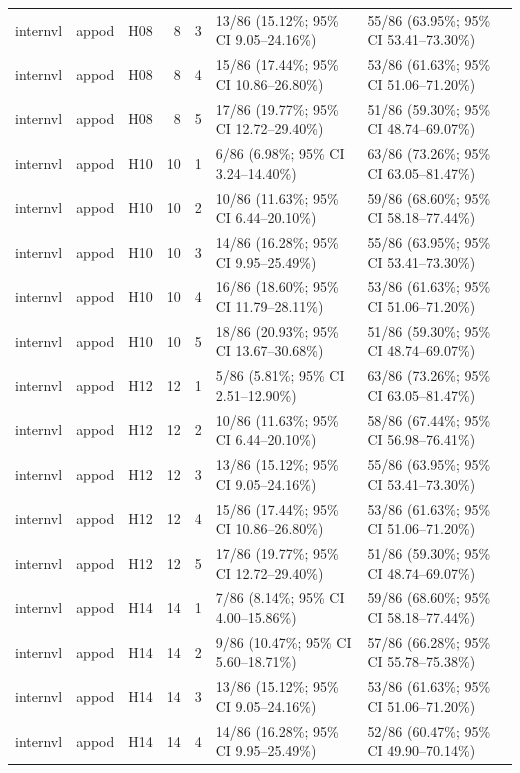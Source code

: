 \begin{longtable}{lllrrll}
internvl & appod & H08 & 8 & 3 & 13/86 (15.12\%; 95\% CI 9.05–24.16\%) & 55/86 (63.95\%; 95\% CI 53.41–73.30\%) \\
internvl & appod & H08 & 8 & 4 & 15/86 (17.44\%; 95\% CI 10.86–26.80\%) & 53/86 (61.63\%; 95\% CI 51.06–71.20\%) \\
internvl & appod & H08 & 8 & 5 & 17/86 (19.77\%; 95\% CI 12.72–29.40\%) & 51/86 (59.30\%; 95\% CI 48.74–69.07\%) \\
internvl & appod & H10 & 10 & 1 & 6/86 (6.98\%; 95\% CI 3.24–14.40\%) & 63/86 (73.26\%; 95\% CI 63.05–81.47\%) \\
internvl & appod & H10 & 10 & 2 & 10/86 (11.63\%; 95\% CI 6.44–20.10\%) & 59/86 (68.60\%; 95\% CI 58.18–77.44\%) \\
internvl & appod & H10 & 10 & 3 & 14/86 (16.28\%; 95\% CI 9.95–25.49\%) & 55/86 (63.95\%; 95\% CI 53.41–73.30\%) \\
internvl & appod & H10 & 10 & 4 & 16/86 (18.60\%; 95\% CI 11.79–28.11\%) & 53/86 (61.63\%; 95\% CI 51.06–71.20\%) \\
internvl & appod & H10 & 10 & 5 & 18/86 (20.93\%; 95\% CI 13.67–30.68\%) & 51/86 (59.30\%; 95\% CI 48.74–69.07\%) \\
internvl & appod & H12 & 12 & 1 & 5/86 (5.81\%; 95\% CI 2.51–12.90\%) & 63/86 (73.26\%; 95\% CI 63.05–81.47\%) \\
internvl & appod & H12 & 12 & 2 & 10/86 (11.63\%; 95\% CI 6.44–20.10\%) & 58/86 (67.44\%; 95\% CI 56.98–76.41\%) \\
internvl & appod & H12 & 12 & 3 & 13/86 (15.12\%; 95\% CI 9.05–24.16\%) & 55/86 (63.95\%; 95\% CI 53.41–73.30\%) \\
internvl & appod & H12 & 12 & 4 & 15/86 (17.44\%; 95\% CI 10.86–26.80\%) & 53/86 (61.63\%; 95\% CI 51.06–71.20\%) \\
internvl & appod & H12 & 12 & 5 & 17/86 (19.77\%; 95\% CI 12.72–29.40\%) & 51/86 (59.30\%; 95\% CI 48.74–69.07\%) \\
internvl & appod & H14 & 14 & 1 & 7/86 (8.14\%; 95\% CI 4.00–15.86\%) & 59/86 (68.60\%; 95\% CI 58.18–77.44\%) \\
internvl & appod & H14 & 14 & 2 & 9/86 (10.47\%; 95\% CI 5.60–18.71\%) & 57/86 (66.28\%; 95\% CI 55.78–75.38\%) \\
internvl & appod & H14 & 14 & 3 & 13/86 (15.12\%; 95\% CI 9.05–24.16\%) & 53/86 (61.63\%; 95\% CI 51.06–71.20\%) \\
internvl & appod & H14 & 14 & 4 & 14/86 (16.28\%; 95\% CI 9.95–25.49\%) & 52/86 (60.47\%; 95\% CI 49.90–70.14\%) \\

\end{longtable}
